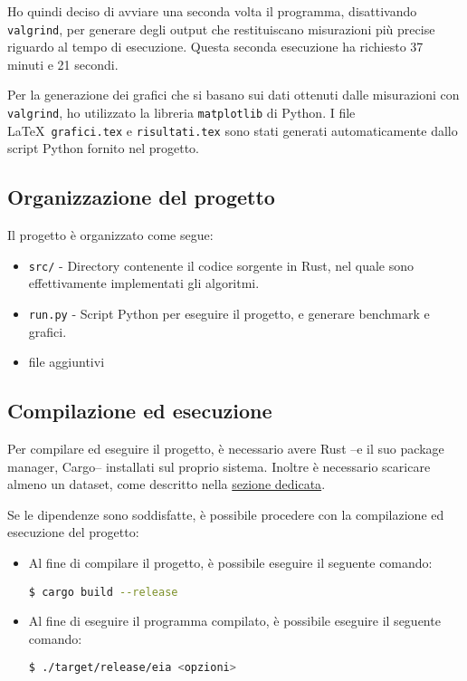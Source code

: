 \documentclass{article}
\begin{document}
Ho quindi deciso di avviare una seconda volta il programma, disattivando \texttt{valgrind},
per generare degli output che restituiscano misurazioni più precise riguardo al tempo di esecuzione.
Questa seconda esecuzione ha richiesto 37 minuti e 21 secondi.
\vspace*{1em}

Per la generazione dei grafici che si basano sui dati ottenuti dalle misurazioni con \texttt{valgrind},
ho utilizzato la libreria \texttt{matplotlib} di Python.
I file \LaTeX\ \texttt{grafici.tex} e \texttt{risultati.tex} sono stati generati automaticamente dallo script Python fornito nel progetto.

\subsection{Organizzazione del progetto}
Il progetto è organizzato come segue:
\begin{itemize}
	\item \texttt{src/} - Directory contenente il codice sorgente in Rust, nel quale sono effettivamente implementati gli algoritmi.
	\item \texttt{run.py} - Script Python per eseguire il progetto, e generare benchmark e grafici.
	\item file aggiuntivi
\end{itemize}

\subsection{Compilazione ed esecuzione}
Per compilare ed eseguire il progetto, è necessario avere Rust --e il suo package manager, Cargo-- installati sul proprio sistema.
Inoltre è necessario scaricare almeno un dataset, come descritto nella \hyperref[sec:dataset]{sezione dedicata}.
\vspace*{1em}

Se le dipendenze sono soddisfatte, è possibile procedere con la compilazione ed esecuzione del progetto:
\begin{itemize}
	\item Al fine di compilare il progetto, è possibile eseguire il seguente comando:

	      \lstinline[language=bash]|$ cargo build --release|
	\item Al fine di eseguire il programma compilato, è possibile eseguire il seguente comando:

	      \lstinline[language=bash]|$ ./target/release/eia <opzioni>|
\end{itemize}
\end{document}
